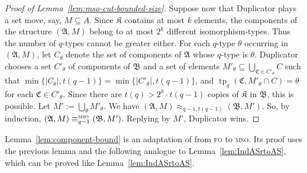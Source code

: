 \documentclass[11pt]{article}
\newcommand{\logic}[1]{\textsc{#1}}
\newcommand{\FO}{\logic{fo}}
\newcommand{\MSO}{\logic{mso}}
\newcommand{\eleq}[1][]{\equiv_{#1}}
\newcommand{\msoeleq}[1][]{\eleq[#1]^{\MSO{}}}
\newcommand{\absval}[1]{\vert #1 \vert}
\DeclareMathOperator{\tp}{tp}
\newcommand{\struct}[1]{\mathfrak{#1}}
\newcommand{\AS}{\struct{A}}
\newcommand{\BS}{\struct{B}}
\newcommand{\CS}{\struct{C}}
\newcommand{\KS}{\struct{K}}
\newcommand{\set}[1]{\{#1\}}
\newcommand{\intersect}{\cap}
\newcommand{\bigunion}{\bigcup}
\begin{document}
\begin{proof}[Proof of Lemma~\ref{lem:mso-cut-bounded-size}]
  Suppose now that Duplicator plays a set move, say, $M\subseteq A$.
  Since $\KS$ contains at most $k$ elements, the components of the
  structure $(\AS,M)$ belong to at most $2^k$ different
  isomorphism-types. Thus the number of $q$-types cannot be greater
  either. For each $q$-type $\theta$ occurring in $(\AS,M)$, let
  $C_\theta$ denote the set of components of $\AS$ whose $q$-type is
  $\theta$. Duplicator chooses a set $C'_\theta$ of components of
  $\BS$ and a set of elements $M'_\theta\subseteq \bigunion_{\CS\in
    C'_\theta} C$ such that $\min\set{\absval{C_{\theta}},
    t(q-1)}=\min\set{\absval{C'_{\theta}}, t(q-1)}$, and $\tp_q(\CS,M'_\theta
  \intersect C)=\theta$ for each $\CS \in C'_\theta$. Since there are $t(q) > 2^k \cdot t(q-1)$
  copies of $\KS$ in $\BS$, this is possible. Let $M' :=
  \bigunion_{\theta} M'_\theta$. We have $(\AS,M) \approx_{q-1,t(q-1)}
  (\BS,M')$. So, by induction, $(\AS,M) \msoeleq[q-1]
  (\BS,M')$. Replying by $M'$, Duplicator wins.
\end{proof}

Lemma~\ref{lem:component-bound} is an adaptation of
\cite[Thm. 6.7]{NesetrilMendez2012} from \FO{} to \MSO{}.  Its proof uses the
previous lemma and the following analogue to Lemma~\ref{lem:IndASrtoAS}, which
can be proved like Lemma~\ref{lem:IndASrtoAS}.
\end{document}

